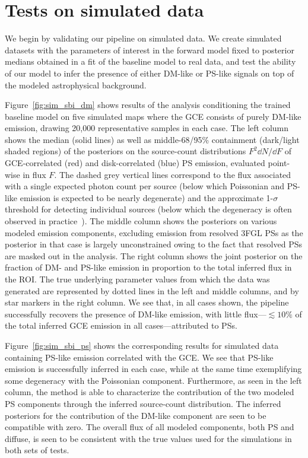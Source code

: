 \documentclass[prd,aps,10pt,nofootinbib,twocolumn,superscriptaddress,preprintnumbers,balancelastpage,longbibliography,floatfix]{revtex4-2}
\begin{document}
\section{Tests on simulated data}
\label{sec:simulations}

We begin by validating our pipeline on simulated \Fermi data. We create simulated datasets with the parameters of interest in the forward model fixed to posterior medians obtained in a fit of the baseline model to real \Fermi data, and test the ability of our model to infer the presence of either DM-like or PS-like signals on top of the modeled astrophysical background.

Figure~\ref{fig:sim_sbi_dm} shows results of the analysis conditioning the trained baseline model on five simulated maps where the GCE consists of purely DM-like emission, drawing 20,000 representative samples in each case. The left column shows the median (solid lines) as well as middle-68/95\% containment (dark/light shaded regions) of the posteriors on the source-count distributions $F^2 \dd N/\dd F$ of GCE-correlated (red) and disk-correlated (blue) PS emission, evaluated point-wise in flux $F$. The dashed grey vertical lines correspond to the flux associated with a single expected photon count per source (below which Poissonian and PS-like emission is expected to be nearly degenerate) and the approximate 1-$\sigma$ threshold for detecting individual sources (below which the degeneracy is often observed in practice~\cite{Chang:2019ars,Buschmann:2020adf}). The middle column shows the posteriors on various modeled emission components, excluding emission from resolved 3FGL PSs as the posterior in that case is largely unconstrained owing to the fact that resolved PSs are masked out in the analysis. The right column shows the joint posterior on the fraction of DM- and PS-like emission in proportion to the total inferred flux in the ROI. The true underlying parameter values from which the data was generated are represented by dotted lines in the left and middle columns, and by star markers in the right column. We see that, in all cases shown, the pipeline successfully recovers the presence of DM-like emission, with little flux---$\lesssim 10\%$ of the total inferred GCE emission in all cases---attributed to PSs. 

Figure~\ref{fig:sim_sbi_ps} shows the corresponding results for simulated data containing PS-like emission correlated with the GCE. We see that PS-like emission is successfully inferred in each case, while at the same time exemplifying some degeneracy with the Poissonian component. Furthermore, as seen in the left column, the method is able to characterize the contribution of the two modeled PS components through the inferred source-count distribution. The inferred posteriors for the contribution of the DM-like component are seen to be compatible with zero. The overall flux of all modeled components, both PS and diffuse, is seen to be consistent with the true values used for the simulations in both sets of tests.
\end{document}
